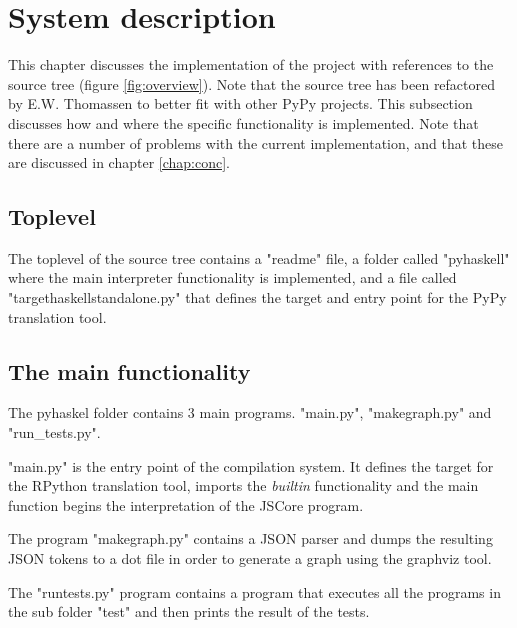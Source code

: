 

\chapter{System description}
\label{chap:impl}

This chapter discusses the implementation of the project with
references to the source tree (figure \ref{fig:overview}).
Note that the source tree has been refactored by E.W. Thomassen
to better fit with other PyPy projects. This subsection discusses how
and where the specific functionality is implemented. Note that there
are a number of problems with the current implementation, and that
these are discussed in chapter \ref{chap:conc}.

\section{Toplevel}

The toplevel of the source tree contains a "readme" file, a folder
called "pyhaskell" where the main interpreter functionality is 
implemented, and a file called "targethaskellstandalone.py" that 
defines the target and entry point for the PyPy translation tool.

\section{The main functionality}

The pyhaskel folder contains 3 main programs. "main.py",
"makegraph.py" and "run\_tests.py".

"main.py" is the entry point of the compilation system. It defines
the target for the RPython translation tool, imports the \emph{builtin}
functionality and the main function begins the interpretation of the
JSCore program.

The program "makegraph.py" contains a JSON parser and dumps the resulting
JSON tokens to a dot file in order to generate a graph using the graphviz
tool.

The "runtests.py" program contains a program that executes all the programs
in the sub folder "test" and then prints the result of the tests.

